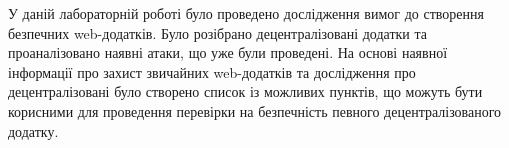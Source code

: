 
У даній лабораторній роботі було проведено дослідження вимог до створення безпечних web-додатків. Було розібрано децентралізовані додатки та проаналізовано наявні атаки, що уже були проведені. На основі наявної інформації про захист звичайних web-додатків та дослідження про децентралізовані було створено список із можливих пунктів, що можуть бути корисними для проведення перевірки на безпечність певного децентралізованого додатку.